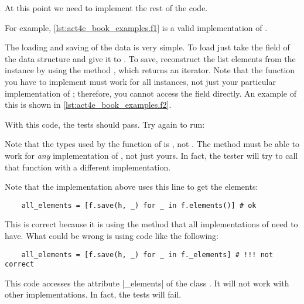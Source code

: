 At this point we need to implement the rest of the code.

For example, \cref{lst:act4e_book_examples.f1} is a valid implementation of \FiniteSet.

\begin{longcode}
    \caption{}
    \label{lst:act4e_book_examples.f1}
\end{longcode}

The loading and saving of the data is very simple.
To load just take the  field of the data structure and give it to .
To save, reconstruct the list elements from the  instance by using the method , which returns an iterator.
Note that the  function you have to implement must work for all \FiniteSet instances, not just your particular implementation of \FiniteSet; therefore, you cannot access the  field directly.
An example of this is shown in \cref{lst:act4e_book_examples.f2}.

\begin{longcode}
    \caption{}
    \label{lst:act4e_book_examples.f2}
\end{longcode}

With this code, the tests should pass.
Try again to run:


Note that the types used by the function  of  is \FiniteSet,
not .
The method must be able to work for \emph{any} implementation of \FiniteSet,
not just yours.
In fact, the tester will try to call that function with a different implementation.

Note that the implementation above uses this line to get the elements:


\begin{verbatim}
    all_elements = [f.save(h, _) for _ in f.elements()] # ok
\end{verbatim}

This is correct because it is using the method  that all implementations of \FiniteSet need to have.
What could be wrong is using code like the following:


\begin{verbatim}
    all_elements = [f.save(h, _) for _ in f._elements] # !!! not correct
\end{verbatim}

This code accesses the attribute \pystr|_elements| of the class .
It will not work with other implementations.
In fact, the tests will fail.

